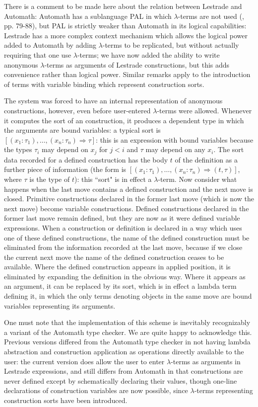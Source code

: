 \documentclass[12pt]{article}
\begin{document}
There is a comment to be made here about the relation between Lestrade and Automath:  Automath has a sublanguage PAL in which $\lambda$-terms are not used (\cite{automathbook}, pp. 79-88), but PAL is strictly weaker than Automath in its logical capabilities:  Lestrade has a more complex context mechanism which allows the logical power added to Automath by adding $\lambda$-terms to be replicated, but without actually requiring that one use $\lambda$-terms;  we have now added the ability to write anonymous $\lambda$-terms as arguments of  Lestrade constructions, but this adds convenience rather than logical power.  Similar remarks apply to the introduction of terms with variable binding which represent construction sorts.

The system was forced to have an internal representation of anonymous constructions, however, even before user-entered $\lambda$-terms were allowed.   Whenever it computes the sort of an construction, it produces a dependent type in which the
arguments are bound variables:  a typical sort is $[(x_1:\tau_1),\ldots,(x_n:\tau_n) \Rightarrow \tau]$:  this is an expression with bound variables because the types $\tau_i$ may depend on $x_j$ for $j<i$ and $\tau$ may depend on any $x_i$.  The sort data recorded for a defined construction has the body $t$ of the definition as a further piece of information  (the form is $[(x_1:\tau_1),\ldots,(x_n:\tau_n) \Rightarrow (t,\tau)]$, where $\tau$ is the type of $t$):  this ``sort"  is in effect a $\lambda$-term.
Now consider what happens when the last move contains a defined construction and the next move is closed.  Primitive constructions declared in the former last move (which is now the next move) become variable constructions.   Defined constructions declared in the former last move remain defined, but they are now as it were defined variable
expressions.   When a construction or definition is declared in a way which uses one of these defined constructions, the name of the defined construction must be eliminated from the information recorded at the last move, because if we close the current next move the name of the defined construction ceases to be available.  Where the defined construction appears in applied position,
it is eliminated by expanding the definition in the obvious way.   Where it appears as an argument, it can be replaced by its sort, which is in effect a lambda term defining it, in which the only terms denoting objects in the same move are bound variables representing its arguments.

One must note that the implementation of this scheme is inevitably recognizably a variant of the Automath type checker.   We are quite happy to acknowledge this.  Previous versions differed from the Automath type checker in not having lambda abstraction and construction application as operations directly available to the user:  the current version does allow the user to enter $\lambda$-terms as arguments in Lestrade expressions, and still differs from Automath in that constructions are never defined  except by schematically declaring their values, though one-line declarations of construction variables are now possible, since $\lambda$-terms representing construction sorts have been introduced.
\end{document}
